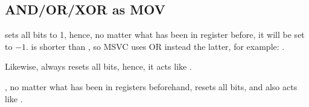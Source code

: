 \subsection{AND/OR/XOR as MOV}

 sets all bits to 1, hence, no matter what has been in register before, it will be set to $-1$.
 is shorter than , so MSVC uses OR instead the latter,
for example: .

Likewise,  always resets all bits, hence, it acts like .

, no matter what has been in registers beforehand, resets all bits, and also acts like .

